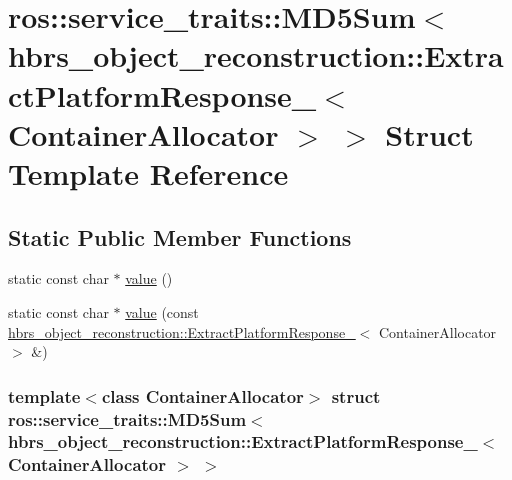 \hypertarget{structros_1_1service__traits_1_1_m_d5_sum_3_01hbrs__object__reconstruction_1_1_extract_platform_1a5b4f3919bb91b97e6e9ba40c8cd7d1}{\section{ros\-:\-:service\-\_\-traits\-:\-:\-M\-D5\-Sum$<$ hbrs\-\_\-object\-\_\-reconstruction\-:\-:\-Extract\-Platform\-Response\-\_\-$<$ \-Container\-Allocator $>$ $>$ \-Struct \-Template \-Reference}
\label{structros_1_1service__traits_1_1_m_d5_sum_3_01hbrs__object__reconstruction_1_1_extract_platform_1a5b4f3919bb91b97e6e9ba40c8cd7d1}
}
\subsection*{\-Static \-Public \-Member \-Functions}
\begin{DoxyCompactItemize}
\item 
static const char $\ast$ \hyperlink{structros_1_1service__traits_1_1_m_d5_sum_3_01hbrs__object__reconstruction_1_1_extract_platform_1a5b4f3919bb91b97e6e9ba40c8cd7d1_a5774f2637e272b9dd4c4e65162c8aab1}{value} ()
\item 
static const char $\ast$ \hyperlink{structros_1_1service__traits_1_1_m_d5_sum_3_01hbrs__object__reconstruction_1_1_extract_platform_1a5b4f3919bb91b97e6e9ba40c8cd7d1_aa933a19a0c072432ffd44c413bda1b21}{value} (const \hyperlink{structhbrs__object__reconstruction_1_1_extract_platform_response__}{hbrs\-\_\-object\-\_\-reconstruction\-::\-Extract\-Platform\-Response\-\_\-}$<$ \-Container\-Allocator $>$ \&)
\end{DoxyCompactItemize}
\subsubsection*{template$<$class Container\-Allocator$>$ struct ros\-::service\-\_\-traits\-::\-M\-D5\-Sum$<$ hbrs\-\_\-object\-\_\-reconstruction\-::\-Extract\-Platform\-Response\-\_\-$<$ Container\-Allocator $>$ $>$}



